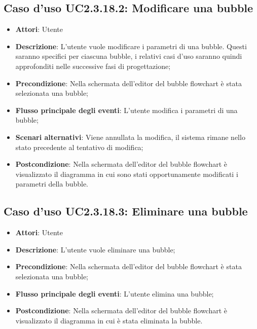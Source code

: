\documentclass[../AnalisiDeiRequisiti.tex]{subfiles}
\begin{document}
					\subsection{Caso d'uso UC2.3.18.2: Modificare una bubble}
					\begin{itemize}
						\item \textbf{Attori}: Utente
						\item \textbf{Descrizione}: L'utente vuole modificare i parametri di una bubble. Questi saranno specifici per ciascuna bubble, i relativi casi d'uso saranno quindi approfonditi nelle successive fasi di progettazione;
						\item \textbf{Precondizione}: Nella schermata dell'editor del bubble flowchart è stata selezionata una bubble;
						\item \textbf{Flusso principale degli eventi}: L'utente modifica i parametri di una bubble;
						\item \textbf{Scenari alternativi}: Viene annullata la modifica, il sistema	rimane nello stato precedente al tentativo di modifica;
						\item \textbf{Postcondizione}: Nella schermata dell'editor del bubble flowchart è visualizzato il diagramma in cui sono stati opportunamente modificati i parametri della bubble.
					\end{itemize}
					\subsection{Caso d'uso UC2.3.18.3: Eliminare una bubble}
					\begin{itemize}
						\item \textbf{Attori}: Utente
						\item \textbf{Descrizione}: L'utente vuole eliminare una bubble;
						\item \textbf{Precondizione}: Nella schermata dell'editor del bubble flowchart è stata selezionata una bubble;
						\item \textbf{Flusso principale degli eventi}: L'utente elimina una bubble;
						\item \textbf{Postcondizione}: Nella schermata dell'editor del bubble flowchart è visualizzato il diagramma in cui è stata eliminata la bubble.
					\end{itemize}
\end{document}
